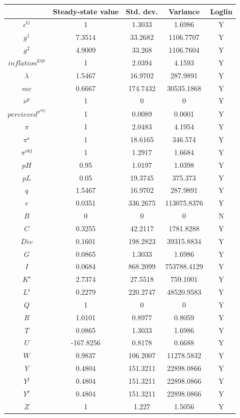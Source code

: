 \begin{tabular}{c|c|c|c|c|}
  & Steady-state value & Std. dev. & Variance & Loglin\\
\hline
$\epsilon^{\mathrm{G}}$ & 1 & 1.3033 & 1.6986 & Y    \\
$g^{\mathrm{1}}$ & 7.3514 & 33.2682 & 1106.7707 & Y    \\
$g^{\mathrm{2}}$ & 4.9009 & 33.268 & 1106.7604 & Y    \\
${i\!n\!f\!l\!a\!t\!i\!o\!n}^{\mathrm{gap}}$ & 1 & 2.0394 & 4.1593 & Y    \\
$\lambda$ & 1.5467 & 16.9702 & 287.9891 & Y    \\
${m\!c}$ & 0.6667 & 174.7432 & 30535.1868 & Y    \\
$\nu^{\mathrm{p}}$ & 1 & 0 & 0 & Y    \\
${p\!e\!r\!c\!i\!e\!v\!e\!d}^{\pi^{\mathrm{obj}}}$ & 1 & 0.0089 & 0.0001 & Y    \\
$\pi$ & 1 & 2.0483 & 4.1954 & Y    \\
$\pi^{\star}$ & 1 & 18.6165 & 346.574 & Y    \\
$\pi^{\mathrm{obj}}$ & 1 & 1.2917 & 1.6684 & Y    \\
${p\!H}$ & 0.95 & 1.0197 & 1.0398 & Y    \\
${p\!L}$ & 0.05 & 19.3745 & 375.373 & Y    \\
$q$ & 1.5467 & 16.9702 & 287.9891 & Y    \\
$r$ & 0.0351 & 336.2675 & 113075.8376 & Y    \\
$B$ & 0 & 0 & 0 & N    \\
$C$ & 0.3255 & 42.2117 & 1781.8288 & Y    \\
${D\!i\!v}$ & 0.1601 & 198.2823 & 39315.8834 & Y    \\
$G$ & 0.0865 & 1.3033 & 1.6986 & Y    \\
$I$ & 0.0684 & 868.2099 & 753788.4129 & Y    \\
$K^{\mathrm{s}}$ & 2.7374 & 27.5518 & 759.1001 & Y    \\
$L^{\mathrm{s}}$ & 0.2279 & 220.2747 & 48520.9583 & Y    \\
$Q$ & 1 & 0 & 0 & Y    \\
$R$ & 1.0101 & 0.8977 & 0.8059 & Y    \\
$T$ & 0.0865 & 1.3033 & 1.6986 & Y    \\
$U$ & -167.8256 & 0.8178 & 0.6688 & Y    \\
$W$ & 0.9837 & 106.2007 & 11278.5832 & Y    \\
$Y$ & 0.4804 & 151.3211 & 22898.0866 & Y    \\
$Y^{\mathrm{j}}$ & 0.4804 & 151.3211 & 22898.0866 & Y    \\
$Y^{\mathrm{s}}$ & 0.4804 & 151.3211 & 22898.0866 & Y    \\
$Z$ & 1 & 1.227 & 1.5056 & Y    \\
\hline
\end{tabular}


